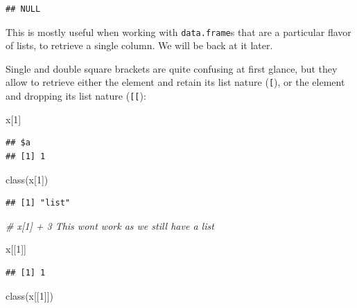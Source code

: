 \documentclass[
]{book}
\newenvironment{Shaded}{\begin{snugshade}}{\end{snugshade}}
\newcommand{\CommentTok}[1]{\textcolor[rgb]{0.56,0.35,0.01}{\textit{#1}}}
\newcommand{\DecValTok}[1]{\textcolor[rgb]{0.00,0.00,0.81}{#1}}
\newcommand{\FunctionTok}[1]{\textcolor[rgb]{0.00,0.00,0.00}{#1}}
\newcommand{\NormalTok}[1]{#1}
\newcommand{\SpecialCharTok}[1]{\textcolor[rgb]{0.00,0.00,0.00}{#1}}
\begin{document}
\begin{Shaded}
\end{Shaded}

\begin{verbatim}
## NULL
\end{verbatim}

This is mostly useful when working with \texttt{data.frame}s that are a particular flavor of lists, to retrieve a single column. We will be back at it later.

Single and double square brackets are quite confusing at first glance, but they allow to retrieve either the element and retain its list nature (\texttt{{[}}), or the element and dropping its list nature (\texttt{{[}{[}}):

\begin{Shaded}
\begin{Highlighting}[]
\NormalTok{x[}\DecValTok{1}\NormalTok{]}
\end{Highlighting}
\end{Shaded}

\begin{verbatim}
## $a
## [1] 1
\end{verbatim}

\begin{Shaded}
\begin{Highlighting}[]
\FunctionTok{class}\NormalTok{(x[}\DecValTok{1}\NormalTok{])}
\end{Highlighting}
\end{Shaded}

\begin{verbatim}
## [1] "list"
\end{verbatim}

\begin{Shaded}
\begin{Highlighting}[]
\CommentTok{\# x[1] + 3 This won\textquotesingle{}t work as we still have a list}

\NormalTok{x[[}\DecValTok{1}\NormalTok{]]}
\end{Highlighting}
\end{Shaded}

\begin{verbatim}
## [1] 1
\end{verbatim}

\begin{Shaded}
\begin{Highlighting}[]
\FunctionTok{class}\NormalTok{(x[[}\DecValTok{1}\NormalTok{]])}
\end{Highlighting}
\end{Shaded}
\end{document}
